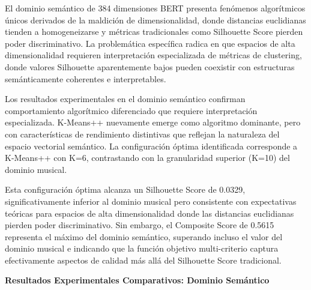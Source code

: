\documentclass[12pt,a4paper]{report}
\begin{document}
El dominio semántico de 384 dimensiones BERT presenta fenómenos algorítmicos únicos derivados de la maldición de dimensionalidad, donde distancias euclidianas tienden a homogeneizarse y métricas tradicionales como Silhouette Score pierden poder discriminativo. La problemática específica radica en que espacios de alta dimensionalidad requieren interpretación especializada de métricas de clustering, donde valores Silhouette aparentemente bajos pueden coexistir con estructuras semánticamente coherentes e interpretables.

Los resultados experimentales en el dominio semántico confirman comportamiento algorítmico diferenciado que requiere interpretación especializada. K-Means++ nuevamente emerge como algoritmo dominante, pero con características de rendimiento distintivas que reflejan la naturaleza del espacio vectorial semántico. La configuración óptima identificada corresponde a K-Means++ con K=6, contrastando con la granularidad superior (K=10) del dominio musical.

Esta configuración óptima alcanza un Silhouette Score de 0.0329, significativamente inferior al dominio musical pero consistente con expectativas teóricas para espacios de alta dimensionalidad donde las distancias euclidianas pierden poder discriminativo. Sin embargo, el Composite Score de 0.5615 representa el máximo del dominio semántico, superando incluso el valor del dominio musical e indicando que la función objetivo multi-criterio captura efectivamente aspectos de calidad más allá del Silhouette Score tradicional.

\textbf{Resultados Experimentales Comparativos: Dominio Semántico}
\end{document}
